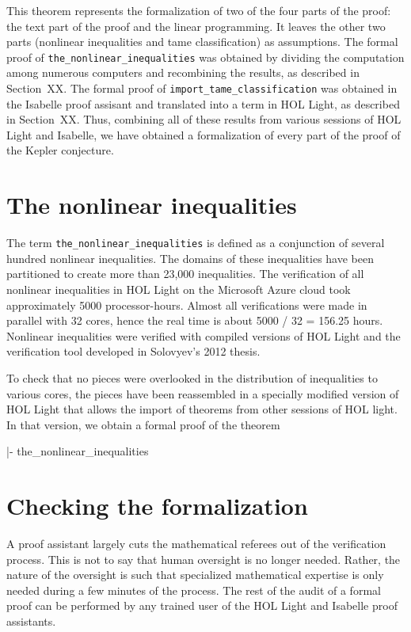 This theorem represents the formalization of two of the four parts of
the proof: the text part of the proof and the linear programming.  It
leaves the other two parts (nonlinear inequalities and tame
classification) as assumptions.  The formal proof of
\verb!the_nonlinear_inequalities! was obtained by dividing the
computation among numerous computers and recombining the results, as
described in Section~XX.  The formal proof of
\verb!import_tame_classification! was obtained in the Isabelle proof
assisant and translated into a term in HOL Light, as described in
Section~XX.  Thus, combining all of these results from various
sessions of HOL Light and Isabelle, we have obtained a formalization
of every part of the proof of the Kepler conjecture.

\section{The nonlinear inequalities}

The term \verb!the_nonlinear_inequalities! is defined as a conjunction of
several hundred nonlinear inequalities. The domains of these
inequalities have been partitioned to create more than 23,000
inequalities. The verification of all nonlinear inequalities in HOL
Light on the Microsoft Azure cloud took approximately 5000
processor-hours. Almost all verifications were made in parallel with
32 cores, hence the real time is about 5000 / 32 = 156.25
hours. Nonlinear inequalities were verified with compiled versions of
HOL Light and the verification tool developed in Solovyev's 2012
thesis.

To check that no pieces were overlooked in the distribution of
inequalities to various cores, the pieces have been reassembled in a
specially modified version of HOL Light that allows the import of
theorems from other sessions of HOL light. In that version, we obtain
a formal proof of the theorem

|- the_nonlinear_inequalities


\section{Checking the formalization}

A proof assistant largely cuts the mathematical referees out of the
verification process.  This is not to say that human oversight is no
longer needed.  Rather, the nature of the oversight is such that
specialized mathematical expertise is only needed during a few minutes
of the process.  The rest of the audit of a formal proof can be
performed by any trained user of the HOL Light and Isabelle proof
assistants.

